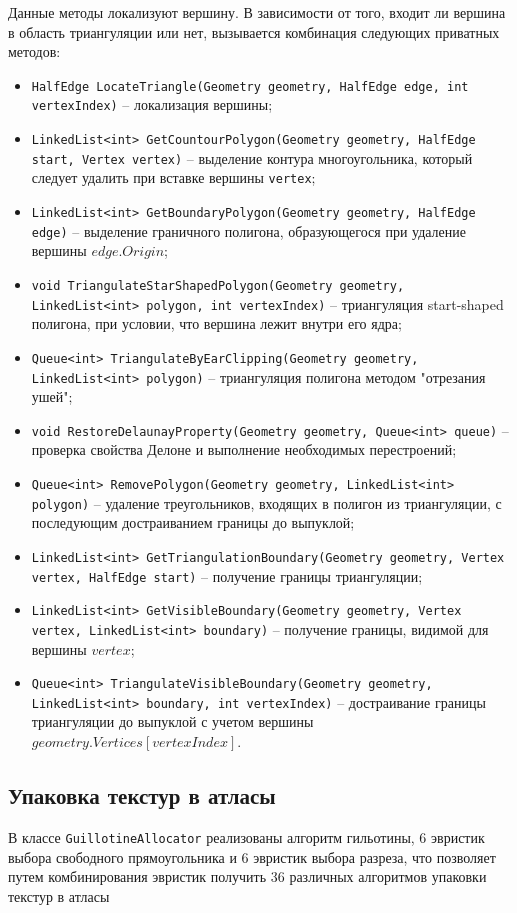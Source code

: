 \documentclass{fefu}
\begin{document}
Данные методы локализуют вершину. В зависимости от того, входит ли вершина в область триангуляции или нет, вызывается
комбинация следующих приватных методов:
\begin{itemize}
    \item \texttt{HalfEdge LocateTriangle(Geometry geometry, HalfEdge edge, int vertexIndex)} -- локализация вершины;
    \item \texttt{LinkedList<int> GetCountourPolygon(Geometry geometry, HalfEdge start, Vertex vertex)} -- выделение контура
    многоугольника, который следует удалить при вставке вершины \texttt{vertex};
    \item \texttt{LinkedList<int> GetBoundaryPolygon(Geometry geometry, HalfEdge edge)} -- выделение граничного полигона,
    образующегося при удаление вершины $edge.Origin$;
    \item \texttt{void TriangulateStarShapedPolygon(Geometry geometry, LinkedList<int> polygon, int vertexIndex)} --
    триангуляция start-shaped полигона, при условии, что вершина лежит внутри его ядра;
    \item \texttt{Queue<int> TriangulateByEarClipping(Geometry geometry, LinkedList<int> polygon)} -- триангуляция полигона
    методом "отрезания ушей";
    \item \texttt{void RestoreDelaunayProperty(Geometry geometry, Queue<int> queue)} -- проверка свойства Делоне и выполнение
    необходимых перестроений;
    \item \texttt{Queue<int> RemovePolygon(Geometry geometry, LinkedList<int> polygon)} -- удаление треугольников, входящих в
    полигон из триангуляции, с последующим достраиванием границы до выпуклой;
    \item \texttt{LinkedList<int> GetTriangulationBoundary(Geometry geometry, Vertex vertex, HalfEdge start)} -- получение
    границы триангуляции;
    \item \texttt{LinkedList<int> GetVisibleBoundary(Geometry geometry, Vertex vertex, LinkedList<int> boundary)} -- получение
    границы, видимой для вершины $vertex$;
    \item \texttt{Queue<int> TriangulateVisibleBoundary(Geometry geometry, LinkedList<int> boundary, int vertexIndex)} --
    достраивание границы триангуляции до выпуклой с учетом вершины $geometry.Vertices[vertexIndex]$.
\end{itemize}
\subsection{Упаковка текстур в атласы}
В классе \texttt{GuillotineAllocator} реализованы алгоритм гильотины, 6 эвристик выбора свободного прямоугольника и 6
эвристик выбора разреза, что позволяет путем комбинирования эвристик получить 36 различных алгоритмов упаковки текстур в
атласы
\end{document}
